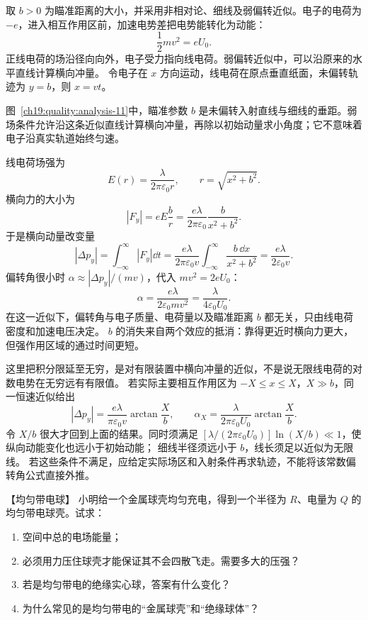 \begin{xesolution}
取 $b>0$ 为瞄准距离的大小，并采用非相对论、细线及弱偏转近似。电子的电荷为 $-e$，进入相互作用区前，加速电势差把电势能转化为动能：
\[
  \frac12mv^2=eU_0.
\]
正线电荷的场沿径向向外，电子受力指向线电荷。弱偏转近似中，可以沿原来的水平直线计算横向冲量。
令电子在 $x$ 方向运动，线电荷在原点垂直纸面，未偏转轨迹为 $y=b$，则 $x=vt$。

\begin{qualityfigure}
\electronLensFigure
{}\label{ch19:quality:analysis-11}
\end{qualityfigure}
图~\ref{ch19:quality:analysis-11}中，瞄准参数 $b$ 是未偏转入射直线与细线的垂距。弱场条件允许沿这条近似直线计算横向冲量，再除以初始动量求小角度；它不意味着电子沿真实轨道始终匀速。

线电荷场强为
\[
  E(r)=\frac{\lambda}{2\pi\varepsilon_0r},
  \qquad r=\sqrt{x^2+b^2}.
\]
横向力的大小为
\[
  |F_y|=eE\frac{b}{r}
  =\frac{e\lambda}{2\pi\varepsilon_0}
  \frac{b}{x^2+b^2}.
\]
于是横向动量改变量
\[
  |\Delta p_y|
  =\int_{-\infty}^{\infty}|F_y|\dd t
  =\frac{e\lambda}{2\pi\varepsilon_0v}
  \int_{-\infty}^{\infty}\frac{b\,\dd x}{x^2+b^2}
  =\frac{e\lambda}{2\varepsilon_0v}.
\]
偏转角很小时 $\alpha\approx|\Delta p_y|/(mv)$，代入 $mv^2=2eU_0$：
\[
  \boxed{\alpha=\frac{e\lambda}{2\varepsilon_0mv^2}
  =\frac{\lambda}{4\varepsilon_0U_0}}.
\]
在这一近似下，偏转角与电子质量、电荷量以及瞄准距离 $b$ 都无关，只由线电荷密度和加速电压决定。
$b$ 的消失来自两个效应的抵消：靠得更近时横向力更大，但强作用区域的通过时间更短。

这里把积分限延至无穷，是对有限装置中横向冲量的近似，不是说无限线电荷的对数电势在无穷远有有限值。
若实际主要相互作用区为 $-X\le x\le X$，$X\gg b$，同一恒速近似给出
\[
 |\Delta p_y|=\frac{e\lambda}{\pi\varepsilon_0v}\arctan\frac Xb,
 \qquad \alpha_X=\frac{\lambda}{2\pi\varepsilon_0U_0}\arctan\frac Xb.
\]
令 $X/b$ 很大才回到上面的结果。同时须满足
$[\lambda/(2\pi\varepsilon_0U_0)]\ln(X/b)\ll1$，使纵向动能变化也远小于初始动能；
细线半径须远小于 $b$，线长须足以近似为无限线。
若这些条件不满足，应给定实际场区和入射条件再求轨迹，不能将该常数偏转角公式直接外推。
\end{xesolution}
\begin{origexamplebox}{【均匀带电球】}\label{ch19:ex:s33-2-2}
小明给一个金属球壳均匀充电，得到一个半径为 $R$、电量为 $Q$ 的均匀带电球壳。试求：
\begin{enumerate}[label=\arabic*.]
  \item 空间中总的电场能量；
  \item 必须用力压住球壳才能保证其不会四散飞走。需要多大的压强？
  \item 若是均匀带电的绝缘实心球，答案有什么变化？
  \item 为什么常见的是均匀带电的“金属球壳”和“绝缘球体”？
\end{enumerate}

\ThQSphereEnergy
\end{origexamplebox}\par\nopagebreak[4]


